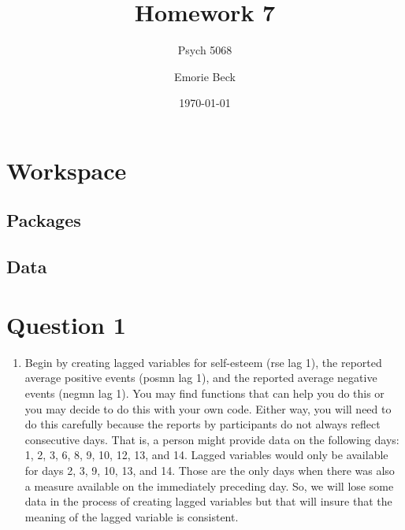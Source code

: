 \documentclass[]{article}
\title{Homework 7}
\subtitle{Psych 5068}
\author{Emorie Beck}
\date{\today}
\newenvironment{Shaded}{\begin{snugshade}}{\end{snugshade}}
\newcommand{\KeywordTok}[1]{\textcolor[rgb]{0.13,0.29,0.53}{\textbf{#1}}}
\newcommand{\StringTok}[1]{\textcolor[rgb]{0.31,0.60,0.02}{#1}}
\newcommand{\OperatorTok}[1]{\textcolor[rgb]{0.81,0.36,0.00}{\textbf{#1}}}
\newcommand{\NormalTok}[1]{#1}
\providecommand{\tightlist}{%
  \setlength{\itemsep}{0pt}\setlength{\parskip}{0pt}}
\begin{document}
\maketitle

{
\setcounter{tocdepth}{2}
\tableofcontents
}
\section{Workspace}\label{workspace}

\subsection{Packages}\label{packages}

\subsection{Data}\label{data}

\begin{Shaded}
\end{Shaded}

\section{Question 1}\label{question-1}

\begin{enumerate}
\def\labelenumi{\arabic{enumi}.}
\tightlist
\item
  Begin by creating lagged variables for self-esteem (rse lag 1), the
  reported average positive events (posmn lag 1), and the reported
  average negative events (negmn lag 1). You may find functions that can
  help you do this or you may decide to do this with your own code.
  Either way, you will need to do this carefully because the reports by
  participants do not always reflect consecutive days. That is, a person
  might provide data on the following days: 1, 2, 3, 6, 8, 9, 10, 12,
  13, and 14. Lagged variables would only be available for days 2, 3, 9,
  10, 13, and 14. Those are the only days when there was also a measure
  available on the immediately preceding day. So, we will lose some data
  in the process of creating lagged variables but that will insure that
  the meaning of the lagged variable is consistent.
\end{enumerate}
\end{document}
